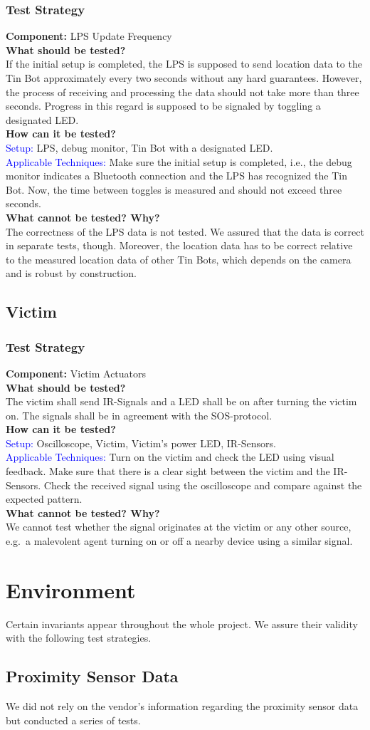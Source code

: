 \documentclass[a4paper,parskip,headheight=38pt]{scrartcl} %
\newcommand{\teststrat}[5]{
    \subsubsection{Test Strategy}
	\textbf{Component:} #1 \\
	\noindent\textbf{What should be tested?} \\
    \noindent #2 \\
	\noindent\textbf{How can it be tested?} \\
    \noindent\textcolor{blue}{Setup:} #3 \\
    \noindent\textcolor{blue}{Applicable Techniques:} #4 \\
	\noindent\textbf{What cannot be tested? Why?} \\
    \noindent #5
}
\newcommand{\ie}{i.e.}
\begin{document}
\teststrat{LPS Update Frequency}{
    If the initial setup is completed, the LPS is supposed to send location data
    to the Tin Bot approximately every two seconds without any hard guarantees.
    However, the process of receiving and processing the data should not take
    more than three seconds. Progress in this regard is supposed to be signaled
    by toggling a designated LED.
}{
    LPS, debug monitor, Tin Bot with a designated LED.
}{
    Make sure the initial setup is completed, \ie, the debug monitor indicates a
    Bluetooth connection and the LPS has recognized the Tin Bot. Now, the time
    between toggles is measured and should not exceed three seconds.
}{
    The correctness of the LPS data is not tested. We assured that the data is
    correct in separate tests, though. Moreover, the location data has to be
    correct relative to the measured location data of other Tin Bots, which
    depends on the camera and is robust by construction.
}

\subsection{Victim}

\teststrat{Victim Actuators}{
    The victim shall send IR-Signals and a LED shall be on after turning the
    victim on. The signals shall be in agreement with the SOS-protocol.
}{
    Oscilloscope, Victim, Victim's power LED, IR-Sensors.
}{
    Turn on the victim and check the LED using visual feedback. Make sure that
    there is a clear sight between the victim and the IR-Sensors. Check the
    received signal using the oscilloscope and compare against the expected
    pattern.
}{
    We cannot test whether the signal originates at the victim or any other
    source, e.g.\ a malevolent agent turning on or off a nearby device using a
    similar signal.
}

\section{Environment}

Certain invariants appear throughout the whole project. We assure their validity
with the following test strategies.

\subsection{Proximity Sensor Data}

We did not rely on the vendor's information regarding the proximity sensor data
but conducted a series of tests. 
\end{document}
